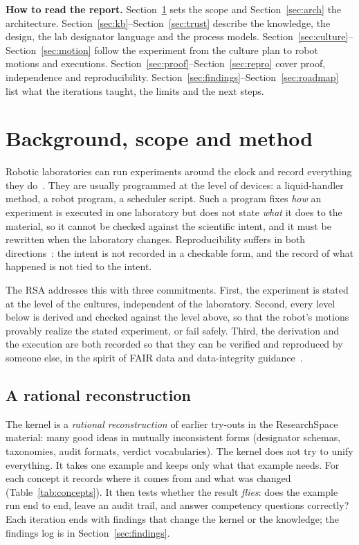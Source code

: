 \documentclass[10pt,a4paper]{article}
\begin{document}
\textbf{How to read the report.} Section~\ref{sec:background} sets the scope and Section~\ref{sec:arch} the architecture. Section~\ref{sec:kb}–Section~\ref{sec:trust} describe the knowledge, the design, the lab designator language and the process models. Section~\ref{sec:culture}–Section~\ref{sec:motion} follow the experiment from the culture plan to robot motions and executions. Section~\ref{sec:proof}–Section~\ref{sec:repro} cover proof, independence and reproducibility. Section~\ref{sec:findings}–Section~\ref{sec:roadmap} list what the iterations taught, the limits and the next steps.

\section{Background, scope and method}\label{sec:background}

Robotic laboratories can run experiments around the clock and record everything they do~\citep{king2009,williams2015,burger2020,abolhasani2023}. They are usually programmed at the level of devices: a liquid-handler method, a robot program, a scheduler script. Such a program fixes \emph{how} an experiment is executed in one laboratory but does not state \emph{what} it does to the material, so it cannot be checked against the scientific intent, and it must be rewritten when the laboratory changes. Reproducibility suffers in both directions~\citep{baker2016}: the intent is not recorded in a checkable form, and the record of what happened is not tied to the intent.

The RSA addresses this with three commitments. First, the experiment is stated at the level of the cultures, independent of the laboratory. Second, every level below is derived and checked against the level above, so that the robot's motions provably realize the stated experiment, or fail safely. Third, the derivation and the execution are both recorded so that they can be verified and reproduced by someone else, in the spirit of FAIR data and data-integrity guidance~\citep{wilkinson2016,fda2018}.

\subsection{A rational reconstruction}\label{sec:recon}

The kernel is a \emph{rational reconstruction} of earlier try-outs in the ResearchSpace material: many good ideas in mutually inconsistent forms (designator schemas, taxonomies, audit formats, verdict vocabularies). The kernel does not try to unify everything. It takes one example and keeps only what that example needs. For each concept it records where it comes from and what was changed (Table~\ref{tab:concepts}). It then tests whether the result \emph{flies}: does the example run end to end, leave an audit trail, and answer competency questions correctly? Each iteration ends with findings that change the kernel or the knowledge; the findings log is in Section~\ref{sec:findings}.
\end{document}
